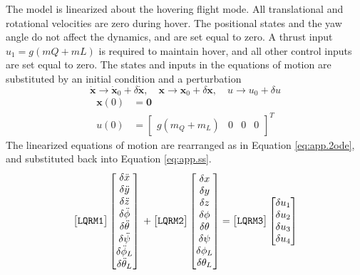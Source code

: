 The model is linearized about the hovering flight mode. All translational and rotational velocities are zero during hover. The positional states and the yaw angle do not affect the dynamics, and are set equal to zero. A thrust input $ u_1=g(mQ+mL) $ is required to maintain hover, and all other control inputs are set equal to zero. 
The states and inputs in the equations of motion are substituted by an initial condition and a perturbation
\begin{equation}\label{key}
\mathbf{\dot{x}}\rightarrow\mathbf{\dot{x}}_0+\delta\mathbf{\dot{x}}, \quad \mathbf{{x}}\rightarrow\mathbf{{x}}_0+\delta\mathbf{{x}}, \quad u\rightarrow u_0+\delta u
\end{equation}
\begin{equation}\label{key}
\begin{aligned}
\mathbf{x}(0) &= \mathbf{0}\\
u(0)&=\begin{bmatrix}
g(m_Q+m_L) &0 &0& 0
\end{bmatrix}^T
\end{aligned}
\end{equation}
The linearized equations of motion are rearranged as in Equation \ref{eq:app.2ode}, and substituted back into Equation \ref{eq:app.ss}.
\begin{equation}\label{eq:app.2ode}
\begin{bmatrix}
\texttt{LQRM1}
\end{bmatrix}
\begin{bmatrix}
		\delta \ddot{x} \\\delta\ddot{y}\\\delta\ddot{z}\\\delta\ddot{\phi}\\\delta\ddot{\theta}\\\delta\ddot{\psi}\\\delta\ddot{\phi}_L\\\delta\ddot{\theta}_L 
		\end{bmatrix}
		\newline
		+
\begin{bmatrix}
\texttt{LQRM2}
\end{bmatrix}
\begin{bmatrix}
		\delta {x} \\\delta{y}\\\delta{z}\\\delta{\phi}\\\delta{\theta}\\\delta{\psi}\\\delta{\phi}_L\\\delta{\theta}_L 
\end{bmatrix}
=
\begin{bmatrix}
\texttt{LQRM3}
\end{bmatrix}
\begin{bmatrix}
\delta u_1\\\delta u_2\\\delta u_3\\\delta u_4
\end{bmatrix}
\end{equation}
